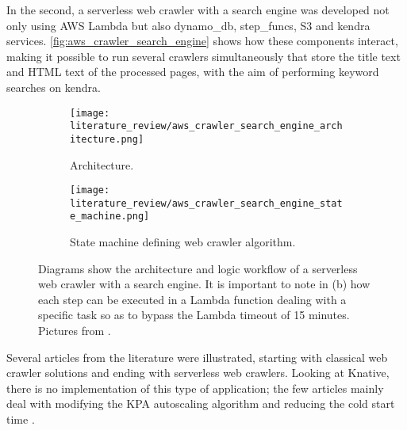 \documentclass[../thesis.tex]{subfiles}
\begin{document}
In the second, a serverless web crawler with a search engine was developed not only using \acrshort{AWS} Lambda but also \gls{dynamo_db}, \gls{step_funcs}, \acrshort{S3} and \gls{kendra} services. \autoref{fig:aws_crawler_search_engine} shows how these components interact, making it possible to run several crawlers simultaneously that store the title text and \acrshort{HTML} text of the processed pages, with the aim of performing keyword searches on \gls{kendra}.

\begin{figure}[H]
    \centering
    \begin{subfigure}[t]{.9\textwidth}
        \centering
        \texttt{[image: literature\_review/aws\_crawler\_search\_engine\_architecture.png]}
        \caption{Architecture.}
        \label{fig:aws_crawler_search_engine_architecture}
    \end{subfigure}
    \vfill
    \begin{subfigure}[t]{.9\textwidth}
        \centering
        \texttt{[image: literature\_review/aws\_crawler\_search\_engine\_state\_machine.png]}
        \caption{State machine defining web crawler algorithm.}
        \label{fig:aws_crawler_search_engine_state_machine}
    \end{subfigure}
    \caption[Example of serverless web crawler architecture]{Diagrams show the architecture and logic workflow of a serverless web crawler with a search engine. It is important to note in (b) how each step can be executed in a Lambda function dealing with a specific task so as to bypass the Lambda timeout of 15 minutes. Pictures from  \cite{site:aws_serverless_crawler_engine_2021}.}
    \label{fig:aws_crawler_search_engine}
\end{figure}

Several articles from the literature were illustrated, starting with classical web crawler solutions and ending with serverless web crawlers. Looking at Knative, there is no implementation of this type of application; the few articles mainly deal with modifying the \acrshort{KPA} autoscaling algorithm and reducing the cold start time \cite{inproceedings:knative_optimize_autoscaler_2020, article:knative_cold_start_pool_2019}.
\end{document}

